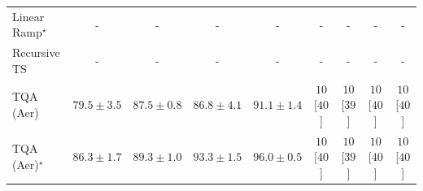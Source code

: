 \begin{tabular}{l|cccc|cccc|}
Linear Ramp$^\star$ & {\cellcolor[HTML]{000000}} \color[HTML]{F1F1F1} {\cellcolor{white}} \color{black} - & {\cellcolor[HTML]{000000}} \color[HTML]{F1F1F1} {\cellcolor{white}} \color{black} - & {\cellcolor[HTML]{000000}} \color[HTML]{F1F1F1} {\cellcolor{white}} \color{black} - & {\cellcolor[HTML]{000000}} \color[HTML]{F1F1F1} {\cellcolor{white}} \color{black} - & {\cellcolor[HTML]{000000}} \color[HTML]{F1F1F1} {\cellcolor{white}} \color{black} - & {\cellcolor[HTML]{000000}} \color[HTML]{F1F1F1} {\cellcolor{white}} \color{black} - & {\cellcolor[HTML]{000000}} \color[HTML]{F1F1F1} {\cellcolor{white}} \color{black} - & {\cellcolor[HTML]{000000}} \color[HTML]{F1F1F1} {\cellcolor{white}} \color{black} - \\
Recursive TS & {\cellcolor[HTML]{000000}} \color[HTML]{F1F1F1} {\cellcolor{white}} \color{black} - & {\cellcolor[HTML]{000000}} \color[HTML]{F1F1F1} {\cellcolor{white}} \color{black} - & {\cellcolor[HTML]{000000}} \color[HTML]{F1F1F1} {\cellcolor{white}} \color{black} - & {\cellcolor[HTML]{000000}} \color[HTML]{F1F1F1} {\cellcolor{white}} \color{black} - & {\cellcolor[HTML]{000000}} \color[HTML]{F1F1F1} {\cellcolor{white}} \color{black} - & {\cellcolor[HTML]{000000}} \color[HTML]{F1F1F1} {\cellcolor{white}} \color{black} - & {\cellcolor[HTML]{000000}} \color[HTML]{F1F1F1} {\cellcolor{white}} \color{black} - & {\cellcolor[HTML]{000000}} \color[HTML]{F1F1F1} {\cellcolor{white}} \color{black} - \\
TQA (Aer) & {\cellcolor[HTML]{FFF7BC}} \color[HTML]{000000} $79.5\pm 3.5$ & {\cellcolor[HTML]{FE9B2B}} \color[HTML]{000000} $87.5\pm 0.8$ & {\cellcolor[HTML]{FEA634}} \color[HTML]{000000} $86.8\pm 4.1$ & {\cellcolor[HTML]{E2650F}} \color[HTML]{F1F1F1} $91.1\pm 1.4$ & {\cellcolor[HTML]{FFF7F3}} \color[HTML]{000000} $10$ [$40$] & {\cellcolor[HTML]{FFF7F3}} \color[HTML]{000000} $10$ [$39$] & {\cellcolor[HTML]{FFF7F3}} \color[HTML]{000000} $10$ [$40$] & {\cellcolor[HTML]{FFF7F3}} \color[HTML]{000000} $10$ [$40$] \\
TQA (Aer)$^\star$ & {\cellcolor[HTML]{FEAE3B}} \color[HTML]{000000} $86.3\pm 1.7$ & {\cellcolor[HTML]{F27F1B}} \color[HTML]{F1F1F1} $89.3\pm 1.0$ & {\cellcolor[HTML]{C64902}} \color[HTML]{F1F1F1} $93.3\pm 1.5$ & {\cellcolor[HTML]{933204}} \color[HTML]{F1F1F1} $96.0\pm 0.5$ & {\cellcolor[HTML]{FFF7F3}} \color[HTML]{000000} $10$ [$40$] & {\cellcolor[HTML]{FFF7F3}} \color[HTML]{000000} $10$ [$39$] & {\cellcolor[HTML]{FFF7F3}} \color[HTML]{000000} $10$ [$40$] & {\cellcolor[HTML]{FFF7F3}} \color[HTML]{000000} $10$ [$40$] \\

\end{tabular}
